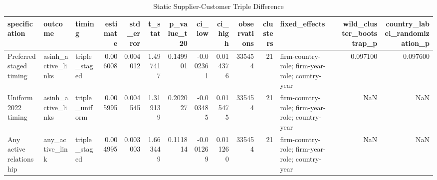 \begin{table}
\caption{Static Supplier-Customer Triple Difference}
\label{tab:table3_static_ddd}
\begin{tabular}{lllrrrrrrrrlrr}
\toprule
specification & outcome & timing & estimate & std_error & t_stat & p_value_t20 & ci_low & ci_high & observations & clusters & fixed_effects & wild_cluster_bootstrap_p & country_label_randomization_p \\
\midrule
Preferred staged timing & asinh_active_links & triple_staged & 0.006008 & 0.004012 & 1.497417 & 0.149901 & -0.002361 & 0.014376 & 335454 & 21 & firm-country-role; firm-year-role; country-year & 0.097100 & 0.097600 \\
Uniform 2022 timing & asinh_active_links & triple_uniform & 0.005995 & 0.004545 & 1.319139 & 0.202027 & -0.003485 & 0.015475 & 335454 & 21 & firm-country-role; firm-year-role; country-year & NaN & NaN \\
Any active relationship & any_active_link & triple_staged & 0.004995 & 0.003003 & 1.663449 & 0.111814 & -0.001269 & 0.011260 & 335454 & 21 & firm-country-role; firm-year-role; country-year & NaN & NaN \\
\bottomrule
\end{tabular}
\end{table}
